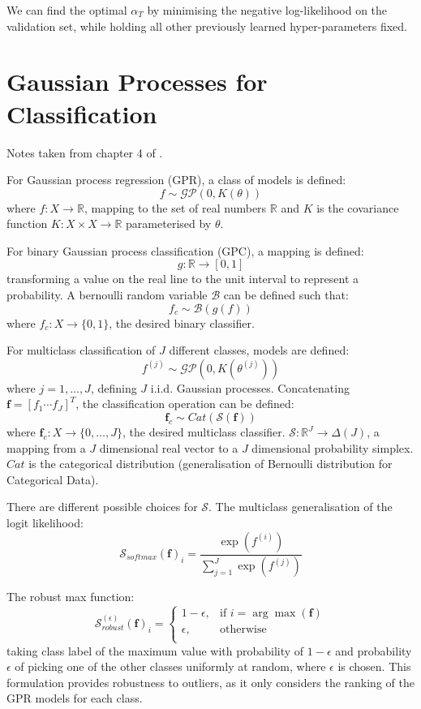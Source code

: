 \documentclass[twoside,11pt]{article}
\begin{document}
We can find the optimal $\alpha_T$ by minimising the negative log-likelihood on the validation set, while holding all other previously learned hyper-parameters fixed.


\section{Gaussian Processes for Classification}\label{sec:gaussian-processes-for-classification}

Notes taken from chapter 4 of \cite{matthews2017scalable}.

For Gaussian process regression (GPR), a class of models is defined:
\[f \sim \mathcal{GP}(0, K(\theta))\]
where $f: X \rightarrow \mathbb{R}$, mapping to the set of real numbers $\mathbb{R}$ and $K$ is the covariance function $K: X \times X \rightarrow \mathbb{R}$ parameterised by $\theta$.

For binary Gaussian process classification (GPC), a mapping is defined:
\[g: \mathbb{R} \rightarrow [0, 1]\]
transforming a value on the real line to the unit interval to represent a probability.
A bernoulli random variable $\mathcal{B}$ can be defined such that:
\[f_c \sim \mathcal{B}(g(f))\]
where $f_c: X \rightarrow \{0, 1\}$, the desired binary classifier.

For multiclass classification of $J$ different classes, models are defined:
\[f^{(j)} \sim \mathcal{GP}(0, K(\theta^{(j)}))\]
where $j=1, \dots, J$, defining $J$ i.i.d. Gaussian processes.
Concatenating $\mathbf{f} = [f_1 \cdots f_J]^T$, the classification operation can be defined:
\[\mathbf{f}_c \sim Cat (\mathcal{S}(\mathbf{f}))\]
where $\mathbf{f}_c: X \rightarrow \{0, \dots, J\}$, the desired multiclass classifier. $\mathcal{S}: \mathbb{R}^J \rightarrow \Delta(J)$, a mapping from a $J$ dimensional real vector to a $J$ dimensional probability simplex. $Cat$ is the categorical distribution (generalisation of Bernoulli distribution for Categorical Data).

There are different possible choices for $\mathcal{S}$.
The multiclass generalisation of the logit likelihood:
\[\mathcal{S}_{softmax}(\mathbf{f})_i = \frac{\exp(f^{(i)})}{\sum_{j=1}^{J} \exp(f^{(j)})}\]

The robust max function:
\[\mathcal{S}_{robust}^{(\epsilon)}(\mathbf{f})_i = \begin{cases}
      1-\epsilon, &  \text{if } i = \arg \max(\mathbf{f}) \\
      \epsilon, & \text{otherwise} \\
   \end{cases}\]
taking class label of the maximum value with probability of $1-\epsilon$ and probability $\epsilon$ of picking one of the other classes uniformly at random, where $\epsilon$ is chosen.
This formulation provides robustness to outliers, as it only considers the ranking of the GPR models for each class.
\end{document}
